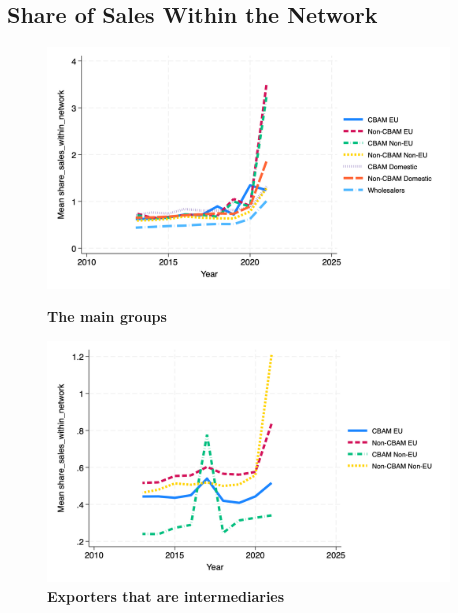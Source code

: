 \documentclass{article}
\begin{document}
\subsection{Share of Sales Within the Network}
\begin{figure}[H]
\centering
\includegraphics[width=0.95\textwidth]{share_sales_within_network_main_groups.png}
\caption{\textbf{The main groups}}
\includegraphics[width=0.95\textwidth]{share_sales_within_network_ei.png}
\caption{\textbf{Exporters that are intermediaries}}
\end{figure}
\end{document}
